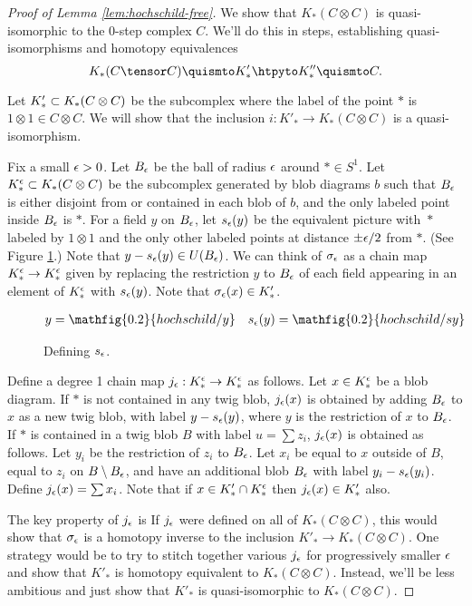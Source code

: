 \begin{proof}[Proof of Lemma \ref{lem:hochschild-free}]
We show that $K_*(C\otimes C)$ is
quasi-isomorphic to the 0-step complex $C$. We'll do this in steps, establishing quasi-isomorphisms and homotopy equivalences
$$K_*(C \tensor C) \quismto K'_* \htpyto K''_* \quismto C.$$

Let $K'_* \subset K_*(C\otimes C)$ be the subcomplex where the label of
the point $*$ is $1 \otimes 1 \in C\otimes C$.
We will show that the inclusion $i: K'_* \to K_*(C\otimes C)$ is a quasi-isomorphism.

Fix a small $\epsilon > 0$.
Let $B_\epsilon$ be the ball of radius $\epsilon$ around $* \in S^1$.
Let $K_*^\epsilon \subset K_*(C\otimes C)$ be the subcomplex
generated by blob diagrams $b$ such that $B_\epsilon$ is either disjoint from
or contained in each blob of $b$, and the only labeled point inside $B_\epsilon$ is $*$.
For a field $y$ on $B_\epsilon$, let $s_\epsilon(y)$ be the equivalent picture with~$*$
labeled by $1\otimes 1$ and the only other labeled points at distance $\pm\epsilon/2$ from $*$.
(See Figure \ref{fig:sy}.) Note that $y - s_\epsilon(y) \in U(B_\epsilon)$. We can think of
$\sigma_\epsilon$ as a chain map $K_*^\epsilon \to K_*^\epsilon$ given by replacing the restriction $y$ to $B_\epsilon$ of each field
appearing in an element of  $K_*^\epsilon$ with $s_\epsilon(y)$.
Note that $\sigma_\epsilon(x) \in K'_*$.
\begin{figure}[!ht]
\begin{align*}
y & = \mathfig{0.2}{hochschild/y} &
s_\ep(y) & = \mathfig{0.2}{hochschild/sy}
\end{align*}
\caption{Defining $s_\epsilon$.}
\label{fig:sy}
\end{figure}

Define a degree 1 chain map $j_\epsilon : K_*^\epsilon \to K_*^\epsilon$ as follows.
Let $x \in K_*^\epsilon$ be a blob diagram.
If $*$ is not contained in any twig blob, $j_\epsilon(x)$ is obtained by adding $B_\epsilon$ to
$x$ as a new twig blob, with label $y - s_\epsilon(y)$, where $y$ is the restriction of $x$ to $B_\epsilon$.
If $*$ is contained in a twig blob $B$ with label $u = \sum z_i$, $j_\epsilon(x)$ is obtained as follows.
Let $y_i$ be the restriction of $z_i$ to $B_\epsilon$.
Let $x_i$ be equal to $x$ outside of $B$, equal to $z_i$ on $B \setminus B_\epsilon$,
and have an additional blob $B_\epsilon$ with label $y_i - s_\epsilon(y_i)$.
Define $j_\epsilon(x) = \sum x_i$.
Note that if $x \in K'_* \cap K_*^\epsilon$ then $j_\epsilon(x) \in K'_*$ also.

The key property of $j_\epsilon$ is
If $j_\epsilon$ were defined on all of $K_*(C\otimes C)$, this would show that $\sigma_\epsilon$
is a homotopy inverse to the inclusion $K'_* \to K_*(C\otimes C)$.
One strategy would be to try to stitch together various $j_\epsilon$ for progressively smaller
$\epsilon$ and show that $K'_*$ is homotopy equivalent to $K_*(C\otimes C)$.
Instead, we'll be less ambitious and just show that
$K'_*$ is quasi-isomorphic to $K_*(C\otimes C)$.


\end{proof}
